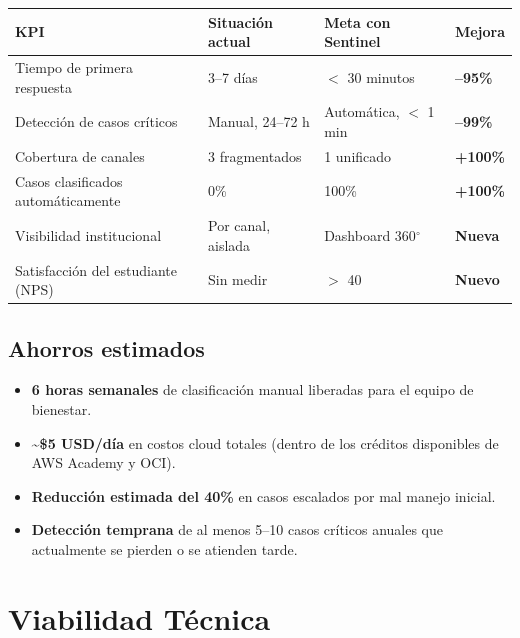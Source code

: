 \documentclass[11pt,a4paper]{article}
\begin{document}
\begin{longtable}{|p{5cm}|p{4cm}|p{4cm}|p{2cm}|}
\hline
\rowcolor{primary!20}
\textbf{KPI} & \textbf{Situaci\'on actual} & \textbf{Meta con Sentinel} & \textbf{Mejora} \\
\hline
\endhead

Tiempo de primera respuesta & 3--7 d\'ias & $<$ 30 minutos & \textbf{--95\%} \\
\hline

Detecci\'on de casos cr\'iticos & Manual, 24--72 h & Autom\'atica, $<$ 1 min & \textbf{--99\%} \\
\hline

Cobertura de canales & 3 fragmentados & 1 unificado & \textbf{+100\%} \\
\hline

Casos clasificados autom\'aticamente & 0\% & 100\% & \textbf{+100\%} \\
\hline

Visibilidad institucional & Por canal, aislada & Dashboard 360$^\circ$ & \textbf{Nueva} \\
\hline

Satisfacci\'on del estudiante (NPS) & Sin medir & $>$ 40 & \textbf{Nuevo} \\
\hline
\end{longtable}

\subsection{Ahorros estimados}

\begin{itemize}[leftmargin=*]
    \item \textbf{6 horas semanales} de clasificaci\'on manual liberadas para el equipo de bienestar.
    \item \textbf{\textasciitilde\$5 USD/d\'ia} en costos cloud totales (dentro de los cr\'editos disponibles de AWS Academy y OCI).
    \item \textbf{Reducci\'on estimada del 40\%} en casos escalados por mal manejo inicial.
    \item \textbf{Detecci\'on temprana} de al menos 5--10 casos cr\'iticos anuales que actualmente se pierden o se atienden tarde.
\end{itemize}

\section{Viabilidad T\'ecnica}
\end{document}

